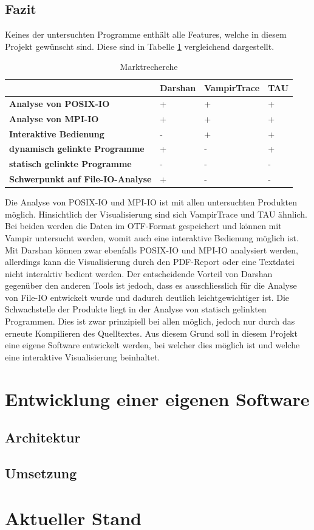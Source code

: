 \section{Fazit}
Keines der untersuchten Programme enth\"alt alle Features, welche in diesem Projekt gew\"unscht sind. Diese sind in Tabelle \ref{tab:Recherche} vergleichend dargestellt.
\begin{table}[h]
	\centering
	\begin{tabular}{l|l|l|l}
		\textbf{} & \textbf{Darshan} & \textbf{VampirTrace}& \textbf{TAU}\\
		\hline
		\textbf{Analyse von POSIX-IO} & + & + & + \\
		\hline
		\textbf{Analyse von MPI-IO} & + & + & + \\
		\hline
		\textbf{Interaktive Bedienung}& - & + & + \\
		\hline
		\textbf{dynamisch gelinkte Programme} & + & - & + \\
		\hline
		\textbf{statisch gelinkte Programme} & - & - & - \\
		\hline
		\textbf{Schwerpunkt auf File-IO-Analyse} & + & - & - \\
	\end{tabular}
	\caption{Marktrecherche}
	\label{tab:Recherche}
\end{table}
Die Analyse von POSIX-IO und MPI-IO ist mit allen untersuchten Produkten m\"oglich. Hinsichtlich der Visualisierung sind sich VampirTrace und TAU \"ahnlich. Bei beiden werden die Daten im OTF-Format gespeichert und k\"onnen mit Vampir untersucht werden, womit auch eine interaktive Bedienung m\"oglich ist. Mit Darshan k\"onnen zwar ebenfalls POSIX-IO und MPI-IO analysiert werden, allerdings kann die Visualisierung durch den PDF-Report oder eine Textdatei nicht interaktiv bedient werden. Der entscheidende Vorteil von Darshan gegen\"uber den anderen Tools ist jedoch, dass es ausschliesslich f\"ur die Analyse von File-IO entwickelt wurde und dadurch deutlich leichtgewichtiger ist.\newline
Die Schwachstelle der Produkte liegt in der Analyse von statisch gelinkten Programmen. Dies ist zwar prinzipiell bei allen m\"oglich, jedoch nur durch das erneute Kompilieren des Quelltextes. Aus diesem Grund soll in diesem Projekt eine eigene Software entwickelt werden, bei welcher dies m\"oglich ist und welche eine interaktive Visualisierung beinhaltet.

\chapter{Entwicklung einer eigenen Software}
\section{Architektur}
\label{sec:real}

\section{Umsetzung}
\label{sec:umsetz}

\chapter{Aktueller Stand}
\label{sec:ergeb}

